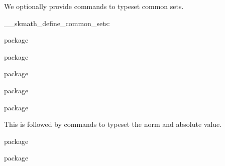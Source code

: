 \documentclass[commonsets,load]{skdoc}
\begin{document}
  We optionally provide commands to typeset common sets.
  \begin{macro}{\__skmath_define_common_sets:}
\begin{MacroCode}{package}
\cs_new:Nn\__skmath_define_common_sets:{
\end{MacroCode}
  \begin{macro}{\N}
\begin{MacroCode}{package}
  \NewDocumentCommand{}
\end{MacroCode}
  \end{macro}
  \begin{macro}{\Z}
\begin{MacroCode}{package}
  \NewDocumentCommand{}
\end{MacroCode}
  \end{macro}
  \begin{macro}{\Q}
\begin{MacroCode}{package}
  \NewDocumentCommand{}
\end{MacroCode}
  \end{macro}
  \begin{macro}{\R}
\begin{MacroCode}{package}
  \NewDocumentCommand{}
\end{MacroCode}
  \end{macro}
  \begin{macro}{\C}
\begin{MacroCode}{package}
  \NewDocumentCommand{}
\end{MacroCode}
  \end{macro}
\begin{MacroCode}{package}
}
\end{MacroCode}
  \end{macro}
 
  This is followed by commands to typeset the norm and absolute value.
  \begin{macro}{\abs}
\begin{MacroCode}{package}
\DeclarePairedDelimiter\abs{\lvert}{\rvert}
\end{MacroCode}
  \end{macro}
  \begin{macro}{\norm}
\begin{MacroCode}{package}
\DeclarePairedDelimiter\norm{\lVert}{\rVert}
\end{MacroCode}
  \end{macro}
\end{document}
